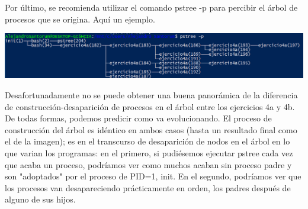 \documentclass[12pt]{article}
\begin{document}
Por último, se recomienda utilizar el comando pstree -p para percibir el árbol de procesos que se origina. Aquí un ejemplo.
\begin{center}
	\includegraphics[scale=0.78]{ej4_pstree.PNG}
\end{center}
Desafortunadamente no se puede obtener una buena panorámica de la diferencia de construcción-desaparición de procesos en el árbol entre los ejercicios 4a y 4b. De todas formas, podemos predicir como va evolucionando. El proceso de construcción del árbol es idéntico en ambos casos (hasta un resultado final como el de la imagen); es en el transcurso de desaparición de nodos en el árbol en lo que varian los programas: en el primero, si pudiésemos ejecutar pstree cada vez que acaba un proceso, podríamos ver como muchos acaban sin proceso padre y son "adoptados" por el proceso de PID=1, init. En el segundo, podríamos ver que los procesos van desapareciendo prácticamente en orden, los padres después de alguno de sus hijos.\\
\end{document}

